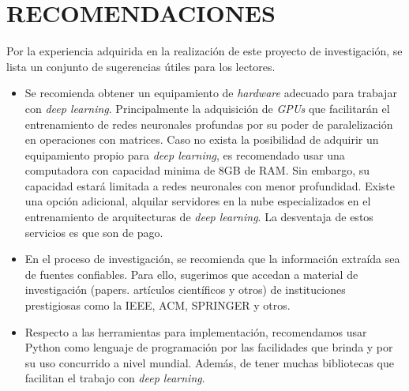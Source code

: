 \chapter*{RECOMENDACIONES}

Por la experiencia adquirida en la realización de este proyecto de investigación, se lista un conjunto de sugerencias útiles para los lectores.

\begin{itemize}


\item Se recomienda obtener un equipamiento de \textit{hardware} adecuado para trabajar con \textit{deep learning}. Principalmente la adquisición de \textit{GPUs} que facilitarán el entrenamiento de redes neuronales profundas por su poder de paralelización en operaciones con matrices. Caso no exista la posibilidad de adquirir un equipamiento propio para \textit{deep learning}, es recomendado usar una computadora con capacidad minima de 8GB  de RAM. Sin embargo, su capacidad estará limitada a redes neuronales con menor profundidad. Existe una opción adicional,  alquilar servidores en la nube especializados en el entrenamiento de arquitecturas de \textit{deep learning}. La desventaja de estos servicios es que son de pago.

\item En el proceso de investigación, se recomienda que la información extraída sea de fuentes confiables. Para ello, sugerimos que accedan a material de investigación (papers. artículos científicos y otros) de instituciones prestigiosas como la IEEE, ACM, SPRINGER y otros.

\item Respecto a las herramientas para implementación,  recomendamos usar Python como lenguaje de programación por las facilidades que brinda y por su uso concurrido a nivel mundial. Además, de tener muchas bibliotecas que facilitan el trabajo con \textit{deep learning}.

\end{itemize}